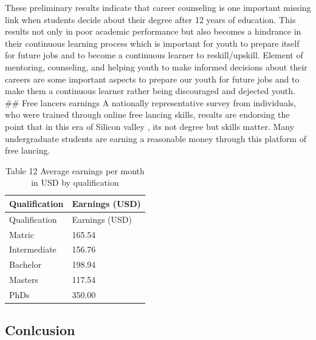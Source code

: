 \documentclass[
]{aft}
\begin{document}
These preliminary results indicate that career counseling is one
important missing link when students decide about their degree after 12
years of education. This results not only in poor academic performance
but also becomes a hindrance in their continuous learning process which
is important for youth to prepare itself for future jobs and to become a
continuous learner to reskill/upskill. Element of mentoring, counseling,
and helping youth to make informed decisions about their careers are
some important aspects to prepare our youth for future jobs and to make
them a continuous learner rather being discouraged and dejected youth.
\#\# Free lancers earnings A nationally representative survey from
individuals, who were trained through online free lancing skills,
results are endorsing the point that in this era of Silicon valley , its
not degree but skills matter. Many undergraduate students are earning a
reasonable money through this platform of free lancing.

\begin{longtable}[]{@{}ll@{}}
\caption{Table 12 Average earnings per month in USD by
qualification}\tabularnewline
\toprule()
Qualification & Earnings (USD) \\
\midrule()
\endfirsthead
\toprule()
Qualification & Earnings (USD) \\
\midrule()
\endhead
Matric & 165.54 \\
Intermediate & 156.76 \\
Bachelor & 198.94 \\
Masters & 117.54 \\
PhDs & 350.00 \\
\bottomrule()
\end{longtable}

\hypertarget{conlcusion}{%
\subsection{Conlcusion}\label{conlcusion}}
\end{document}
